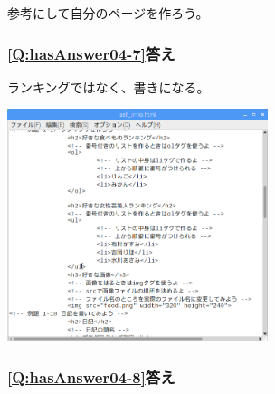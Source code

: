 \documentclass[a4paper,12pt]{jarticle}
\begin{document}
参考にして自分のページを作ろう。

\subsubsection{\bfseries
\ref*{Q:hasAnswer04-7}答え}

ランキングではなく、書きになる。

\centering
\includegraphics[width=7.622cm,height=6.8cm]{textbook-img236.png}
\flushleft

\bigskip

\subsubsection{\bfseries
\ref*{Q:hasAnswer04-8}答え}
\end{document}
